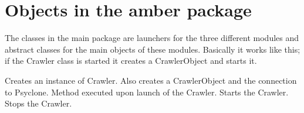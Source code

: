 \section{Objects in the amber package}

The classes in the main package are launchers for the three different modules
and abstract classes for the main objects of these modules. Basically it works
like this; if the Crawler class is started it creates a CrawlerObject and
starts it.



\begin{classmetadata}
\end{classmetadata}

\begin{interface}
    {Creates an instance of Crawler. Also creates a CrawlerObject and the
      connection to Psyclone.}
    {Method executed upon launch of the Crawler.}
    {Starts the Crawler.}
    {Stops the Crawler.}
\end{interface}




\begin{classmetadata}
\end{classmetadata}




\begin{classmetadata}
\end{classmetadata}





\begin{classmetadata}
\end{classmetadata}

